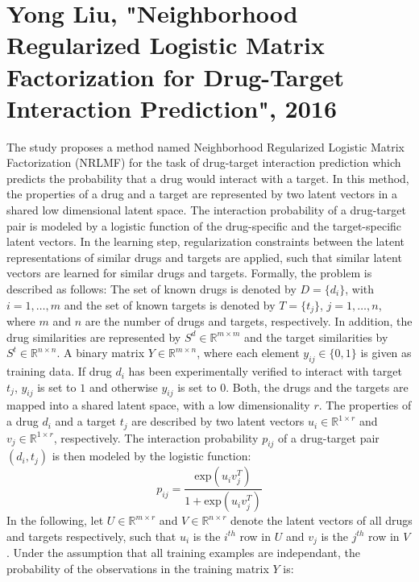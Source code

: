 \section{Yong Liu, "Neighborhood Regularized Logistic Matrix Factorization for Drug-Target Interaction Prediction", 2016}
The study \cite{liu2016neighborhood} proposes a method named Neighborhood Regularized Logistic Matrix Factorization (NRLMF) for the task of drug-target interaction prediction which predicts the probability that a drug would interact with a target. In this method, the properties of a drug and a target are represented by two latent vectors in a shared low dimensional latent space. The interaction probability of a drug-target pair is modeled by a logistic function of the drug-specific and the target-specific latent vectors. In the learning step, regularization constraints between the latent representations of similar drugs and targets are applied, such that similar latent vectors are learned for similar drugs and targets. Formally, the problem is described as follows: The set of known drugs is denoted by $D=\{d_i\}$, with $i=1,\dots,m$ and the set of known targets is denoted by $T=\{t_j\}$, $j=1,\dots,n$, where $m$ and $n$ are the number of drugs and targets, respectively. In addition, the drug similarities are represented by $S^d \in \mathbb{R}^{m \times m}$ and the target similarities by $S^t \in \mathbb{R}^{n \times n}$. A binary matrix $Y \in \mathbb{R}^{m \times n}$, where each element $y_{ij}\in \{0,1\}$ is given as training data. If drug $d_i$ has been experimentally verified to interact with target $t_j$, $y_{ij}$ is set to $1$ and otherwise $y_{ij}$ is set to $0$. Both, the drugs and the targets are mapped into a shared latent space, with a low dimensionality $r$. The properties of a drug $d_i$ and a target $t_j$ are described by two latent vectors $u_i \in \mathbb{R}^{1 \times r}$ and $v_j \in \mathbb{R}^{1\times r}$, respectively. The interaction probability $p_{ij}$ of a drug-target pair $(d_i, t_j)$ is then modeled by the logistic function:
\begin{equation}
\label{eq:blabla}
p_{ij}=\frac{\text{exp}(u_i v_j^T)}{1+\text{exp}(u_iv_j^T)}
\end{equation}
In the following, let $U\in \mathbb{R}^{m \times r}$ and $V \in \mathbb{R}^{n \times r}$ denote the latent vectors of all drugs and targets respectively, such that $u_i$ is the $i^{th}$ row in $U$ and $v_j$ is the $j^{th}$ row in $V$. 
Under the assumption that all training examples are independant, the probability of the observations in the training matrix $Y$ is:

